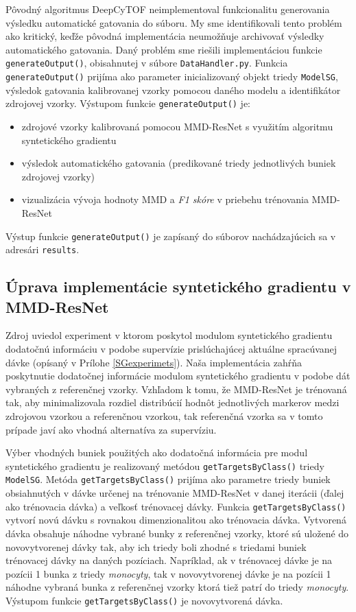 Pôvodný algoritmus DeepCyTOF neimplementoval funkcionalitu generovania výsledku automatické gatovania do súboru. My sme identifikovali tento problém ako kritický, keďže pôvodná implementácia neumožňuje archivovať výsledky automatického gatovania. Daný problém sme riešili implementáciou funkcie \texttt{generateOutput()}, obisahnutej v súbore \texttt{DataHandler.py}. Funkcia \texttt{generateOutput()} prijíma ako parameter inicializovaný objekt triedy \texttt{ModelSG}, výsledok gatovania kalibrovanej vzorky pomocou daného modelu a identifikátor zdrojovej vzorky. Výstupom funkcie \texttt{generateOutput()} je:
\begin{itemize}
    \item zdrojové vzorky kalibrovaná pomocou MMD-ResNet s využitím algoritmu syntetického gradientu
    \item výsledok automatického gatovania (predikované triedy jednotlivých buniek zdrojovej vzorky)
    \item vizualizácia vývoja hodnoty MMD a \textit{F1 skóre} v priebehu trénovania MMD-ResNet
\end{itemize}
Výstup funkcie \texttt{generateOutput()} je zapísaný do súborov nachádzajúcich sa v adresári \texttt{results}.

\subsection{Úprava implementácie syntetického gradientu v MMD-ResNet}
\label{uprava_implementacie_ResNet}

Zdroj \cite{Jaderberg2016} uviedol experiment v ktorom poskytol modulom syntetického gradientu dodatočnú informáciu v podobe supervízie prislúchajúcej aktuálne spracúvanej dávke (opísaný v Prílohe \ref{SGexperimets}). Naša implementácia zahŕňa poskytnutie dodatočnej informácie modulom syntetického gradientu v podobe dát vybraných z referenčnej vzorky. Vzhľadom k tomu, že MMD-ResNet je trénovaná tak, aby minimalizovala rozdiel distribúcií hodnôt jednotlivých markerov medzi zdrojovou vzorkou a referenčnou vzorkou, tak referenčná vzorka sa v tomto prípade javí ako vhodná alternatíva za supervíziu.

Výber vhodných buniek použitých ako dodatočná informácia pre modul syntetického gradientu je realizovaný metódou \texttt{getTargetsByClass()} triedy \texttt{ModelSG}. Metóda \texttt{getTargetsByClass()} prijíma ako parametre triedy buniek obsiahnutých v dávke určenej na trénovanie MMD-ResNet v danej iterácii (ďalej ako trénovacia dávka) a veľkosť trénovacej dávky. Funkcia \texttt{getTargetsByClass()} vytvorí novú dávku s rovnakou dimenzionalitou ako trénovacia dávka. Vytvorená dávka obsahuje náhodne vybrané bunky z referenčnej vzorky, ktoré sú uložené do novovytvorenej dávky tak, aby ich triedy boli zhodné s triedami buniek trénovacej dávky na daných pozíciach. Napríklad, ak v trénovacej dávke je na pozícii 1 bunka z triedy \textit{monocyty}, tak v novovytvorenej dávke je na pozícii 1 náhodne vybraná bunka z referenčnej vzorky ktorá tiež patrí do triedy \textit{monocyty}. Výstupom funkcie \texttt{getTargetsByClass()} je novovytvorená dávka.

